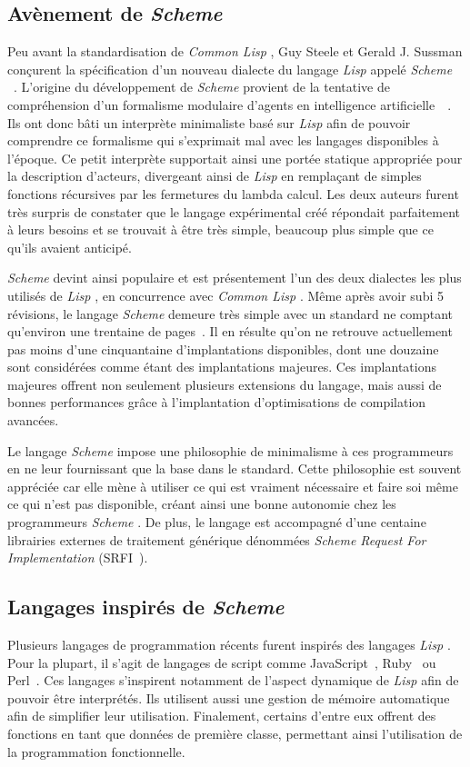 \documentclass[12pt,twoside,letterpaper,francais]{book}
\newcommand{\lisp}{{\textit{Lisp }}}
\newcommand{\clisp}{{\textit{Common Lisp }}}
\newcommand{\Schemelang}{{\textit{Scheme }}}
\begin{document}
\FloatBarrier
\subsection{Avènement de \Schemelang}
Peu avant la standardisation de \clisp, Guy Steele et Gerald
J. Sussman conçurent la spécification d'un nouveau dialecte du langage
\lisp appelé \Schemelang~\cite{SCHEME_ORIGINS}. L'origine du développement
de \Schemelang provient de la tentative de compréhension d'un formalisme
modulaire d'agents en intelligence
artificielle~\cite{ACTOR}~\cite{Scheme-History}. Ils ont donc bâti un
interprète minimaliste basé sur \lisp afin de pouvoir comprendre ce
formalisme qui s'exprimait mal avec les langages disponibles à
l'époque. Ce petit interprète supportait ainsi une portée statique
appropriée pour la description d'acteurs, divergeant ainsi de \lisp en
remplaçant de simples fonctions récursives par les fermetures du
lambda calcul. Les deux auteurs furent très surpris de constater que
le langage expérimental créé répondait parfaitement à leurs besoins et
se trouvait à être très simple, beaucoup plus simple que ce qu'ils
avaient anticipé. 

\Schemelang devint ainsi populaire et est présentement l'un des deux
dialectes les plus utilisés de \lisp, en concurrence avec \clisp. Même
après avoir subi 5 révisions, le langage \Schemelang demeure très simple
avec un standard ne comptant qu'environ une trentaine de
pages~\cite{R5RS}. Il en résulte qu'on ne retrouve actuellement pas
moins d'une cinquantaine d'implantations disponibles, dont une
douzaine sont considérées comme étant des implantations majeures. Ces
implantations majeures offrent non seulement plusieurs extensions du
langage, mais aussi de bonnes performances grâce à l'implantation
d'optimisations de compilation avancées.

Le langage \Schemelang impose une philosophie de minimalisme à ces
programmeurs en ne leur fournissant que la base dans le
standard. Cette philosophie est souvent appréciée car elle mène à
utiliser ce qui est vraiment nécessaire et faire soi même ce qui n'est
pas disponible, créant ainsi une bonne autonomie chez les programmeurs
\Schemelang. De plus, le langage est accompagné d'une centaine librairies
externes de traitement générique dénommées \textit{Scheme Request For Implementation} (SRFI~\cite{SRFI}).


\FloatBarrier
\subsection{Langages inspirés de \Schemelang}
Plusieurs langages de programmation récents furent inspirés des
langages \lisp. Pour la plupart, il s'agit de langages de script comme
JavaScript~\cite{ECMA-262}, Ruby~\cite{RUBY} ou Perl~\cite{PERL}. Ces
langages s'inspirent notamment de l'aspect dynamique de \lisp afin de
pouvoir être interprétés. Ils utilisent aussi une gestion de mémoire
automatique afin de simplifier leur utilisation. Finalement, certains
d'entre eux offrent des fonctions en tant que données de première
classe, permettant ainsi l'utilisation de la programmation
fonctionnelle.
\end{document}
